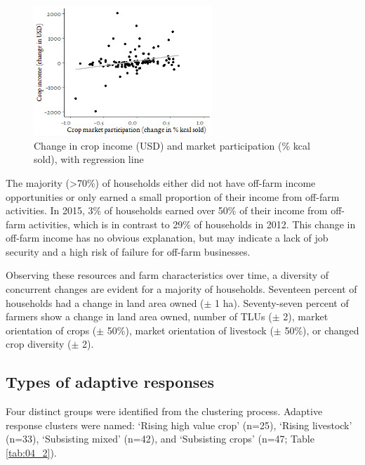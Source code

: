 \begin{figure}[H]
  \includegraphics[width=0.6\textwidth]{figs_04/image3.png}
\captionsetup{singlelinecheck = off, justification=justified}
  \caption{Change in crop income (USD) and market participation (\% kcal sold), with regression line}
  \label{fig:04_2}
\end{figure}

The majority ({\textgreater}70\%) of households either did not have off-farm income opportunities or only earned a small proportion of their income from off-farm activities. In 2015, 3\% of households earned over 50\% of their income from off-farm activities, which is in contrast to 29\% of households in 2012. This change in off-farm income has no obvious explanation, but may indicate a lack of job security and a high risk of failure for off-farm businesses.

Observing these resources and farm characteristics over time, a diversity of concurrent changes are evident for a majority of households. Seventeen percent of households had a change in land area owned (${\pm}$ 1 ha). Seventy-seven percent of farmers show a change in land area owned, number of TLUs (${\pm}$ 2), market orientation of crops (${\pm}$ 50\%), market orientation of livestock (${\pm}$ 50\%), or changed crop diversity (${\pm}$ 2).

\subsection{Types of adaptive responses}

Four distinct groups were identified from the clustering process. Adaptive response clusters were named: `Rising high value crop' (n=25), `Rising livestock' (n=33), `Subsisting mixed' (n=42), and `Subsisting crops' (n=47; Table \ref{tab:04_2}).

